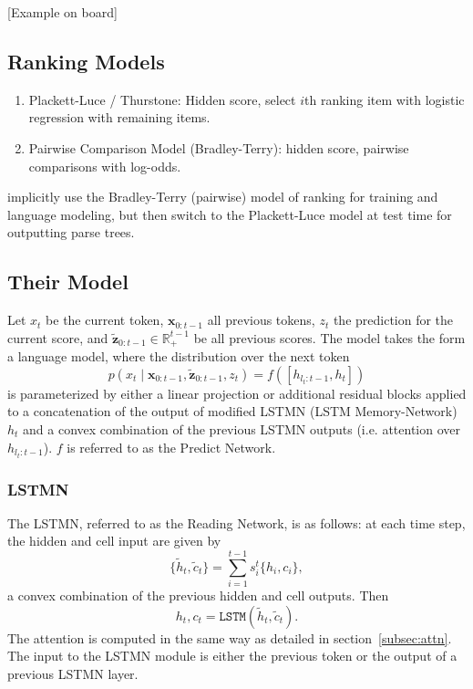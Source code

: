 \documentclass{article}
\newcommand{\bx}{\mathbf{x}}
\newcommand{\bz}{\mathbf{z}}
\newcommand{\R}{\mathbb{R}}
\begin{document}
[Example on board]

\subsection{Ranking Models}
\begin{enumerate}
\item Plackett-Luce / Thurstone: Hidden score, select $i$th ranking item with logistic regression with remaining items.
\item Pairwise Comparison Model (Bradley-Terry): hidden score, pairwise comparisons with log-odds.
\end{enumerate}
\citet{shen2018prpn} implicitly use the Bradley-Terry (pairwise) model of ranking for training and language modeling,
but then switch to the Plackett-Luce model at test time for outputting parse trees.

\subsection{Their Model}
Let $x_t$ be the current token, $\bx_{0:t-1}$ all previous tokens, $z_t$ the prediction for the current score,
and $\tilde{\bz}_{0:t-1}\in\R^{t-1}_+$ be all previous scores.
The model takes the form a language model, where
the distribution over the next token
$$p(x_t\mid \bx_{0:t-1}, \tilde{\bz}_{0:t-1},z_t) = f([h_{l_t:t-1},h_t])$$
is parameterized by either a linear projection or additional residual blocks
applied to a concatenation of the output of modified LSTMN (LSTM Memory-Network) $h_t$
and a convex combination of the previous LSTMN outputs (i.e. attention over $h_{l_t:t-1}$).
$f$ is referred to as the Predict Network.

\subsubsection{LSTMN}
\label{subsec:lstmn}
The LSTMN, referred to as the Reading Network, is as follows:
at each time step, the hidden and cell input are given by
$$\{\tilde{h}_t,\tilde{c}_t\} = \sum_{i=1}^{t-1} s_i^t\{h_i,c_i\},$$
a convex combination of the previous hidden and cell outputs.
Then $$h_t,c_t = \texttt{LSTM}(\tilde{h}_t,\tilde{c}_t).$$
The attention is computed in the same way as detailed in section~\ref{subsec:attn}.
The input to the LSTMN module is either the previous token or the
output of a previous LSTMN layer.
\end{document}
